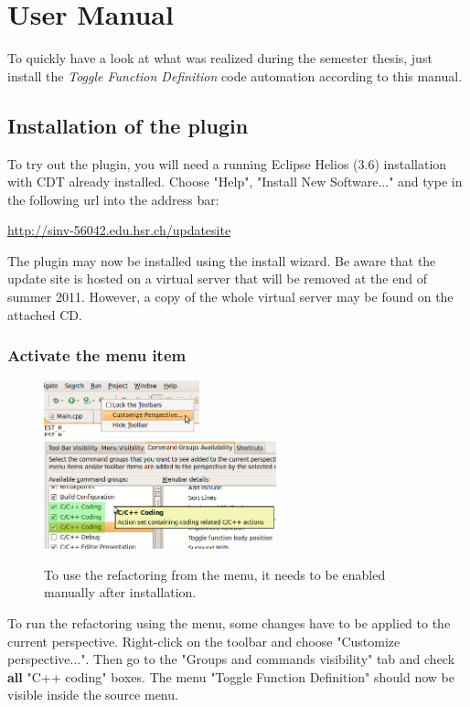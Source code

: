 \chapter{User Manual}
\thispagestyle{fancy}

To quickly have a look at what was realized during the semester thesis, just 
install the \textit{Toggle Function Definition} code automation according to 
this manual.

\section{Installation of the plugin}

To try out the plugin, you will need a running Eclipse Helios (3.6) installation with CDT already installed. Choose "Help", "Install New Software..." and type in the following url into the address bar:

\url{http://sinv-56042.edu.hsr.ch/updatesite}

The plugin may now be installed using the install wizard. Be aware that the 
update site is hosted on a virtual server that will be removed at the end of 
summer 2011. However, a copy of the whole virtual server may be found on the 
attached CD.

\subsection{Activate the menu item}

\begin{figure}[h]
\includegraphics[width=0.4\textwidth]{images/customizeperspective.png}
\includegraphics[width=0.6\textwidth]{images/commandgroups.png}
\caption{To use the refactoring from the menu, it needs to be enabled manually 
after installation.}
\label{showMenu}
\end{figure}
\label{cmdGroup}
To run the refactoring using the menu, some changes have to be applied to the 
current perspective. Right-click on the toolbar and choose 
"Customize perspective...". Then go to the "Groups and commands visibility" tab 
and check \textbf{all} "C++ coding" boxes. The menu "Toggle Function Definition" 
should now be visible inside the source menu.

